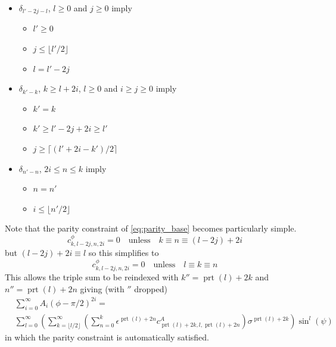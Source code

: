 \documentclass[a4paper]{amsart}
\DeclareMathOperator{\prt}{prt}
\begin{document}
\begin{itemize}
\item $\delta_{l'-2j-l}$, $l\geq 0$ and $j\geq 0$ imply
\begin{itemize}
\item $l'\geq 0$
\item $j\leq \lfloor l'/2\rfloor$
\item $l=l'-2j$
\end{itemize} 
\item $\delta_{k'-k}$, $k\geq l + 2i$, $l\geq 0$ and $i\geq j\geq 0$ imply
\begin{itemize}
\item $k'=k$
\item $k'\geq l'-2j+2i\geq l'$
\item $j\geq \lceil(l'+2i-k')/2\rceil$
\end{itemize}
\item $\delta_{n'-n}$, $2i\leq n\leq k$ imply
\begin{itemize}
\item $n=n'$
\item $i\leq \lfloor n'/2\rfloor$
\end{itemize}
\end{itemize}
%
Note that the parity constraint of \eqref{eq:parity_base} becomes particularly simple. 
\begin{equation*}
c^{\phi}_{k,l-2j,n,2i}=0\quad\text{unless}\quad k\equiv n\equiv (l-2j)+2i
\end{equation*}
but $(l-2j)+2i\equiv l$ so this simplifies to 
\begin{equation}\label{eq:parity_series}
c^{\phi}_{k,l-2j,n,2i}=0\quad\text{unless}\quad l\equiv k\equiv n
\end{equation}
This allows the triple sum to be reindexed with $k''=\prt(l)+2k$ and $n''=\prt(l)+2n$ giving (with $''$ dropped)
\begin{align*}
&\sum_{i=0}^\infty A_i(\phi-\pi/2)^{2i}=\\
&\sum_{l=0}^\infty\left(\sum_{k= \lfloor l/2\rfloor}^\infty\left(\sum_{n=0}^k\epsilon^{\prt(l)+2n}c^A_{\prt(l)+2k,l,\prt(l)+2n}\right)\sigma^{\prt(l)+2k}\right)\sin^l(\psi)
\end{align*}
in which the parity constraint is automatically satisfied.
\end{document}

